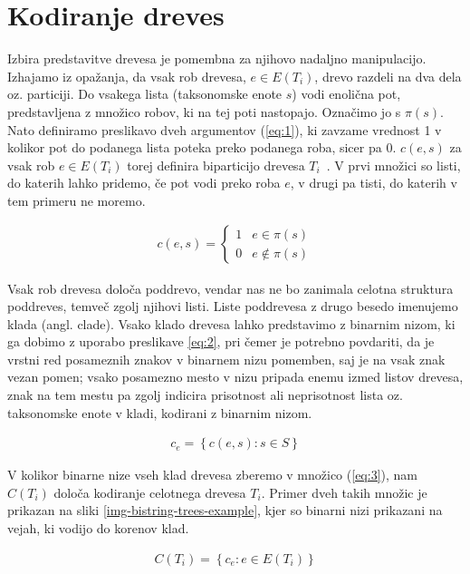 \documentclass[a4paper, 12pt]{book}
\begin{document}
\section{Kodiranje dreves}
Izbira predstavitve drevesa je pomembna za njihovo nadaljno manipulacijo. Izhajamo iz opažanja, da vsak rob drevesa, $e \in E(T_i)$, drevo razdeli na dva dela oz. particiji. Do vsakega lista (taksonomske enote $s$) vodi enolična pot, predstavljena z množico robov, ki na tej poti nastopajo. Označimo jo s $\pi(s)$. Nato definiramo preslikavo dveh argumentov (\ref{eq:1}), ki zavzame vrednost 1 v kolikor pot do podanega lista poteka preko podanega roba, sicer pa 0. $c(e, s)$ za vsak rob $e \in E(T_i)$ torej definira biparticijo drevesa $T_i$~\cite{pw}. V prvi množici so listi, do katerih lahko pridemo, če pot vodi preko roba $e$, v drugi pa tisti, do katerih v tem primeru ne moremo.

\begin{align}
	c(e, s) = 
	\left\{
		\begin{array}{ll}
			1 & e \in \pi(s) \\
			0 & e \notin \pi(s)
		\end{array}
	\right.
	\label{eq:1}
\end{align}

Vsak rob drevesa določa poddrevo, vendar nas ne bo zanimala celotna struktura poddreves, temveč zgolj njihovi listi. Liste poddrevesa z drugo besedo imenujemo klada (angl. clade). Vsako klado drevesa lahko predstavimo z binarnim nizom, ki ga dobimo z uporabo preslikave \ref{eq:2}, pri čemer je potrebno povdariti, da je vrstni red posameznih znakov v binarnem nizu pomemben, saj je na vsak znak vezan pomen; vsako posamezno mesto v nizu pripada enemu izmed listov drevesa, znak na tem mestu pa zgolj indicira prisotnost ali neprisotnost lista oz. taksonomske enote v kladi, kodirani z binarnim nizom.


\begin{align}
	c_e = \left\{ c(e, s): s \in S \right\} \label{eq:2}
\end{align}

V kolikor binarne nize vseh klad drevesa zberemo v množico (\ref{eq:3}), nam $C(T_i)$ določa kodiranje celotnega drevesa $T_i$. Primer dveh takih množic je prikazan na sliki \ref{img-bistring-trees-example}, kjer so binarni nizi prikazani na vejah, ki vodijo do korenov klad.

\begin{align}
	C(T_i) = \left\{ c_e : e \in E(T_i) \right\} \label{eq:3}
\end{align}
\end{document}
